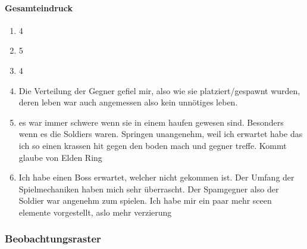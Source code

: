 \documentclass[../Main.tex]{subfiles}
\begin{document}
\paragraph{Gesamteindruck}
\begin{enumerate}[label=\textbf{Q\arabic*}, leftmargin=1.5cm, itemsep=0.8em, resume]
\item 4
\item 5
\item 4
\item Die Verteilung der Gegner gefiel mir, also wie sie platziert/gespawnt wurden, deren leben war auch angemessen also kein unnötiges leben.
\item es war immer schwere wenn sie in einem haufen gewesen sind. Besonders wenn es die Soldiers waren. Springen unangenehm, weil ich erwartet habe das ich so einen krassen hit gegen den boden mach und gegner treffe. Kommt glaube von Elden Ring
\item Ich habe einen Boss erwartet, welcher nicht gekommen ist. Der Umfang der Spielmechaniken haben mich sehr überrascht. Der Spamgegner also der Soldier war angenehm zum spielen. Ich habe mir ein paar mehr sceen elemente vorgestellt, aslo mehr verzierung
\end{enumerate}

\subsubsection{Beobachtungsraster}
\end{document}
